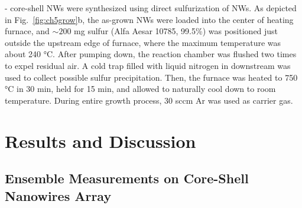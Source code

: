 - core-shell NWs were synthesized using direct sulfurization of  NWs. As depicted in Fig.~\ref{fig:ch5grow}b, the as-grown  NWs were loaded into the center of heating furnace, and $\sim200$ mg sulfur (Alfa Aesar 10785, 99.5\%) was positioned just outside the upstream edge of furnace, where the maximum temperature was about 240 \si{\degreeCelsius}. After pumping down, the reaction chamber was flushed two times to expel residual air. A cold trap filled with liquid nitrogen in downstream was used to collect possible sulfur precipitation. Then, the furnace was heated to 750 \si{\degreeCelsius} in 30 min, held for 15 min, and allowed to naturally cool down to room temperature. During entire growth process, 30 sccm Ar was used as carrier gas.

\section{Results and Discussion}
\subsection{Ensemble Measurements on Core-Shell Nanowires Array}

